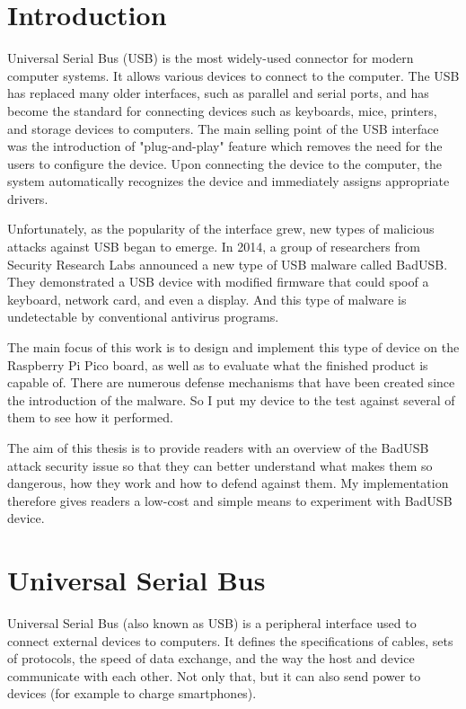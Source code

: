 \chapter{Introduction}
Universal Serial Bus (USB) is the most widely-used connector for modern computer systems. It allows various devices to connect to the computer. The USB has replaced many older interfaces, such as parallel and serial ports, and has become the standard for connecting devices such as keyboards, mice, printers, and storage devices to computers. The main selling point of the USB interface was the introduction of "plug-and-play" feature which removes the need for the users to configure the device. Upon connecting the device to the computer, the system automatically recognizes the device and immediately assigns appropriate drivers.

Unfortunately, as the popularity of the interface grew, new types of malicious attacks against USB began to emerge. In 2014, a group of researchers from Security Research Labs announced a new type of USB malware called BadUSB. They demonstrated a USB device with modified firmware that could spoof a keyboard, network card, and even a display. And this type of malware is undetectable by conventional antivirus programs.

The main focus of this work is to design and implement this type of device on the Raspberry Pi Pico board, as well as to evaluate what the finished product is capable of. There are numerous defense mechanisms that have been created since the introduction of the malware. So I put my device to the test against several of them to see how it performed.

The aim of this thesis is to provide readers with an overview of the BadUSB attack security issue so that they can better understand what makes them so dangerous, how they work and how to defend against them. My implementation therefore gives readers a low-cost and simple means to experiment with BadUSB device.

\chapter{Universal Serial Bus}
\label{usb}
Universal Serial Bus (also known as USB) is a peripheral interface used to connect external devices to computers. It defines the specifications of cables, sets of protocols, the speed of data exchange, and the way the host and device communicate with each other. Not only that, but it can also send power to devices (for example to charge smartphones).

